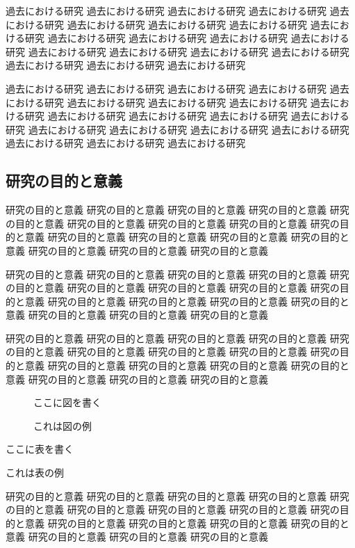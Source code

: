 \documentclass[12pt]{jarticle} %
\begin{document}
過去における研究 過去における研究 過去における研究 過去における研究 
過去における研究 過去における研究 過去における研究 過去における研究 
過去における研究 過去における研究 過去における研究 過去における研究 
過去における研究 過去における研究 過去における研究 過去における研究 
過去における研究 過去における研究 過去における研究 過去における研究 

過去における研究 過去における研究 過去における研究 過去における研究 
過去における研究 過去における研究 過去における研究 過去における研究 
過去における研究 過去における研究 過去における研究 過去における研究 
過去における研究 過去における研究 過去における研究 過去における研究 
過去における研究 過去における研究 過去における研究 過去における研究 

\subsection{研究の目的と意義}

研究の目的と意義 研究の目的と意義 研究の目的と意義 研究の目的と意義 
研究の目的と意義 研究の目的と意義 研究の目的と意義 研究の目的と意義 
研究の目的と意義 研究の目的と意義 研究の目的と意義 研究の目的と意義 
研究の目的と意義 研究の目的と意義 研究の目的と意義 研究の目的と意義 

研究の目的と意義 研究の目的と意義 研究の目的と意義 研究の目的と意義 
研究の目的と意義 研究の目的と意義 研究の目的と意義 研究の目的と意義 
研究の目的と意義 研究の目的と意義 研究の目的と意義 研究の目的と意義 
研究の目的と意義 研究の目的と意義 研究の目的と意義 研究の目的と意義 

研究の目的と意義 研究の目的と意義 研究の目的と意義 研究の目的と意義 
研究の目的と意義 研究の目的と意義 研究の目的と意義 研究の目的と意義 
研究の目的と意義 研究の目的と意義 研究の目的と意義 研究の目的と意義 
研究の目的と意義 研究の目的と意義 研究の目的と意義 研究の目的と意義 

\begin{figure}
\centerline{ここに図を書く}
\caption{これは図の例}
\end{figure}

\begin{table}
\centerline{ここに表を書く}
\caption{これは表の例}
\end{table}

研究の目的と意義 研究の目的と意義 研究の目的と意義 研究の目的と意義 
研究の目的と意義 研究の目的と意義 研究の目的と意義 研究の目的と意義 
研究の目的と意義 研究の目的と意義 研究の目的と意義 研究の目的と意義 
研究の目的と意義 研究の目的と意義 研究の目的と意義 研究の目的と意義 
\end{document}
